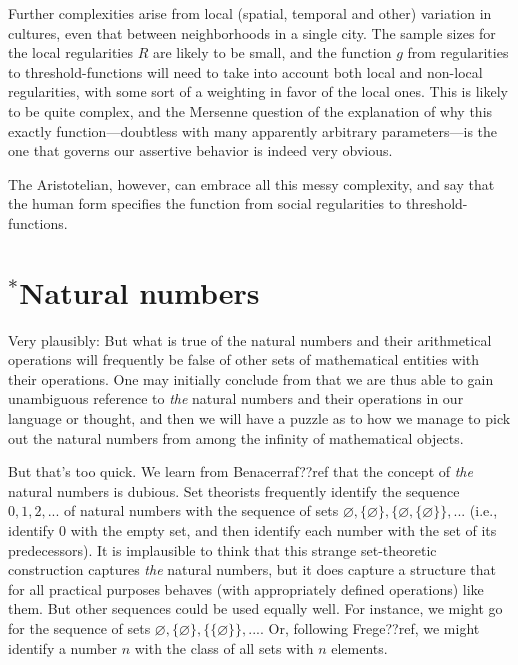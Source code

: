 Further complexities arise from local (spatial, temporal and other) variation in cultures, even that between neighborhoods 
in a single city. The 
sample sizes for the local regularities $R$ are likely to be small, and the function $g$ from regularities to 
threshold-functions will need to take into account both local and non-local regularities, with some sort of a weighting 
in favor of the local ones. This is likely to be quite complex, and the Mersenne question of the explanation of 
why this exactly function---doubtless with many apparently arbitrary parameters---is the one that governs our 
assertive behavior is indeed very obvious. 

The Aristotelian, however, can embrace all this messy complexity, and say that the human form specifies the function from social 
regularities to threshold-functions. 

\section{$^*$Natural numbers}
Very plausibly:
But what is true of the natural numbers and their arithmetical operations will frequently be false of other sets of mathematical
entities with their operations. One may initially conclude from  that we are thus able to gain unambiguous
reference to \textit{the} natural numbers and their operations in our language or thought, and then we will have a puzzle as 
to how we manage to pick out the natural numbers from among the infinity of mathematical objects.

But that's too quick. We learn from Benacerraf??ref that the concept of \textit{the} natural numbers is dubious. Set theorists
frequently identify the sequence $0,1,2,...$ of natural numbers with the sequence of sets $\varnothing, \{\varnothing\},
\{\varnothing, \{\varnothing\}\},...$ (i.e., identify $0$ with the empty set, and then identify each number with the 
set of its predecessors). It is implausible to think that this strange set-theoretic construction captures 
\textit{the} natural numbers, but it does capture a structure that for all practical purposes behaves (with appropriately
defined operations) like them. But other sequences could be used equally well. For instance, we might 
go for the sequence of sets $\varnothing, \{\varnothing\}, \{\{\varnothing\}\},...$. Or, following Frege??ref, we might 
identify a number $n$ with the class of all sets with $n$ elements. 

